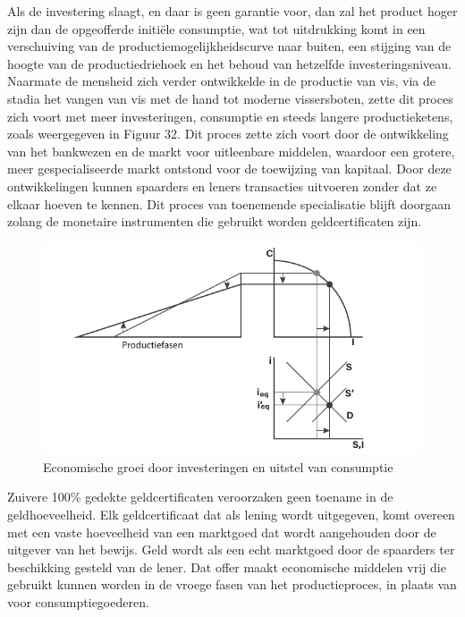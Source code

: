 Als de investering slaagt, en daar is geen garantie voor, dan zal het product hoger zijn dan de opgeofferde initiële consumptie, wat tot uitdrukking komt in een verschuiving van de productiemogelijkheidscurve naar buiten, een stijging van de hoogte van de productiedriehoek en het behoud van hetzelfde investeringsniveau. Naarmate de mensheid zich verder ontwikkelde in de productie van vis, via de stadia het vangen van vis met de hand tot moderne vissersboten, zette dit proces zich voort met meer investeringen, consumptie en steeds langere productieketens, zoals weergegeven in Figuur 32. Dit proces zette zich voort door de ontwikkeling van het bankwezen en de markt voor uitleenbare middelen, waardoor een grotere, meer gespecialiseerde markt ontstond voor de toewijzing van kapitaal. Door deze ontwikkelingen kunnen spaarders en leners transacties uitvoeren zonder dat ze elkaar hoeven te kennen. Dit proces van toenemende specialisatie blijft doorgaan zolang de monetaire instrumenten die gebruikt worden geldcertificaten zijn.

\begin{figure}
    \centering
    \includegraphics[width=\textwidth]{figures/fig32.pdf}
    \caption[Economische groei door investeringen en uitstel van consumptie]{Economische groei door investeringen en uitstel van consumptie}
    \label{fig32}
\end{figure}

Zuivere 100\% gedekte geldcertificaten veroorzaken geen toename in de geldhoeveelheid. Elk geldcertificaat dat als lening wordt uitgegeven, komt overeen met een vaste hoeveelheid van een marktgoed dat wordt aangehouden door de uitgever van het bewijs. Geld wordt als een echt marktgoed door de spaarders ter beschikking gesteld van de lener. Dat offer maakt economische middelen vrij die gebruikt kunnen worden in de vroege fasen van het productieproces, in plaats van voor consumptiegoederen.

